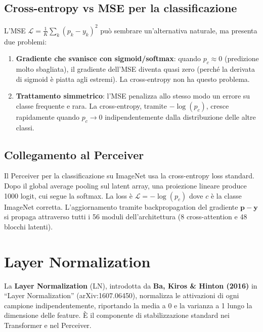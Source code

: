 \documentclass[
  11pt,
]{article}
\begin{document}
\subsection{Cross-entropy vs MSE per la classificazione}

\begin{notabox}[title={\textbf{Perché non usare l'MSE per la classificazione?}}]
L'MSE $\mathcal{L} = \frac{1}{K}\sum_k (p_k - y_k)^2$ può sembrare un'alternativa naturale, ma presenta due problemi:
\begin{enumerate}
  \item \textbf{Gradiente che svanisce con sigmoid/softmax}: quando $p_c \approx 0$ (predizione molto sbagliata), il gradiente dell'MSE diventa quasi zero (perché la derivata di sigmoid è piatta agli estremi). La cross-entropy non ha questo problema.
  \item \textbf{Trattamento simmetrico}: l'MSE penalizza allo stesso modo un errore su classe frequente e rara. La cross-entropy, tramite $-\log(p_c)$, cresce rapidamente quando $p_c \to 0$ indipendentemente dalla distribuzione delle altre classi.
\end{enumerate}
\end{notabox}

\subsection{Collegamento al Perceiver}

\begin{notabox}[title={\textbf{Cross-entropy nel Perceiver}}]
Il Perceiver per la classificazione su ImageNet usa la cross-entropy loss standard. Dopo il global average pooling sul latent array, una proiezione lineare produce 1000 logit, cui segue la softmax. La loss è $\mathcal{L} = -\log(p_c)$ dove $c$ è la classe ImageNet corretta. L'aggiornamento tramite backpropagation del gradiente $\mathbf{p} - \mathbf{y}$ si propaga attraverso tutti i 56 moduli dell'architettura (8 cross-attention e 48 blocchi latenti).
\end{notabox}

\section{Layer Normalization}
\label{app:layernorm}

La \textbf{Layer Normalization} (LN), introdotta da \textbf{Ba, Kiros \& Hinton (2016)} in ``Layer Normalization'' (arXiv:1607.06450), normalizza le attivazioni di ogni campione indipendentemente, riportando la media a 0 e la varianza a 1 lungo la dimensione delle feature. È il componente di stabilizzazione standard nei Transformer e nel Perceiver.
\end{document}
